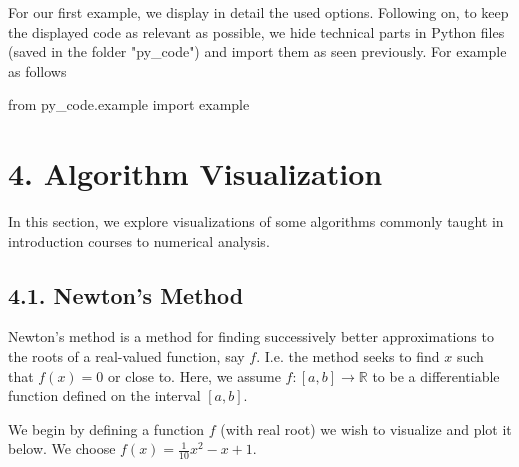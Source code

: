\documentclass[11pt]{article}
\newenvironment{Shaded}{}{}
\newcommand{\NormalTok}[1]{{#1}}
\newcommand{\ImportTok}[1]{{#1}}
\begin{document}
    
    
    
    
    
    
    For our first example, we display in detail the used options. Following
on, to keep the displayed code as relevant as possible, we hide
technical parts in Python files (saved in the folder "py\_code") and
import them as seen previously. For example as follows

\begin{Shaded}
\begin{Highlighting}[]
\ImportTok{from}\NormalTok{ py_code.example }\ImportTok{import}\NormalTok{ example}
\end{Highlighting}
\end{Shaded}

    \section{4. Algorithm Visualization }\label{algorithm-visualization}

In this section, we explore visualizations of some algorithms commonly
taught in introduction courses to numerical analysis.

\subsection{4.1. Newton's Method}\label{newtons-method}

Newton's method is a method for finding successively better
approximations to the roots of a real-valued function, say \(f\). I.e.
the method seeks to find \(x\) such that \(f(x) = 0\) or close to. Here,
we assume \(f:[a,b] \rightarrow \mathbb{R}\) to be a differentiable
function defined on the interval \([a,b]\).

We begin by defining a function \(f\) (with real root) we wish to
visualize and plot it below. We choose
\(f(x)= \frac{1}{10}x^2 - x + 1\).
\end{document}
